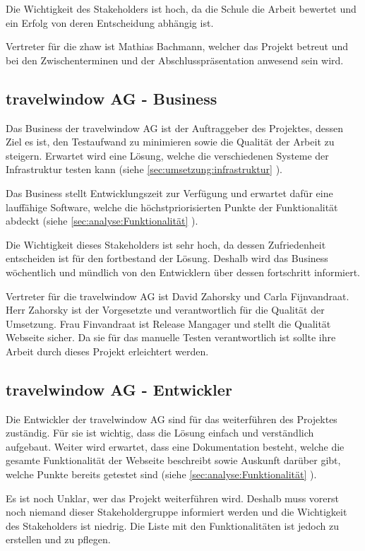 Die Wichtigkeit des Stakeholders ist hoch, da die Schule die Arbeit bewertet und ein Erfolg von deren Entscheidung abhängig ist.

Vertreter für die \gls{zhaw} ist Mathias Bachmann, welcher das Projekt betreut und bei den Zwischenterminen und der Abschlusspräsentation anwesend sein wird.

\subsection{travelwindow AG - Business}
Das Business der travelwindow AG ist der Auftraggeber des Projektes, dessen Ziel es ist, den Testaufwand zu minimieren sowie die Qualität der Arbeit zu steigern. Erwartet wird eine Lösung, welche die verschiedenen Systeme der Infrastruktur testen kann (siehe \cref{sec:umsetzung:infrastruktur} ).

Das Business stellt Entwicklungszeit zur Verfügung und erwartet dafür eine lauffähige Software, welche die höchstpriorisierten Punkte der Funktionalität abdeckt (siehe \cref{sec:analyse:Funktionalität} ).

Die Wichtigkeit dieses Stakeholders ist sehr hoch, da dessen Zufriedenheit entscheiden ist für den fortbestand der Lösung. Deshalb wird das Business wöchentlich und mündlich von den Entwicklern über dessen fortschritt informiert.

Vertreter für die travelwindow AG ist David Zahorsky und Carla Fijnvandraat. Herr Zahorsky ist der Vorgesetzte und verantwortlich für die Qualität der Umsetzung. Frau Finvandraat ist Release Mangager und stellt die Qualität Webseite sicher. Da sie für das manuelle Testen verantwortlich ist sollte ihre Arbeit durch dieses Projekt erleichtert werden.

\subsection{travelwindow AG - Entwickler}
Die Entwickler der travelwindow AG sind für das weiterführen des Projektes zuständig. Für sie ist wichtig, dass die Lösung einfach und verständlich aufgebaut. Weiter wird erwartet, dass eine Dokumentation besteht, welche die gesamte Funktionalität der Webseite beschreibt sowie Auskunft darüber gibt, welche Punkte bereits getestet sind (siehe \cref{sec:analyse:Funktionalität} ).

Es ist noch Unklar, wer das Projekt weiterführen wird. Deshalb muss vorerst noch niemand dieser Stakeholdergruppe informiert werden und die Wichtigkeit des Stakeholders ist niedrig. Die Liste mit den Funktionalitäten ist jedoch zu erstellen und zu pflegen.

